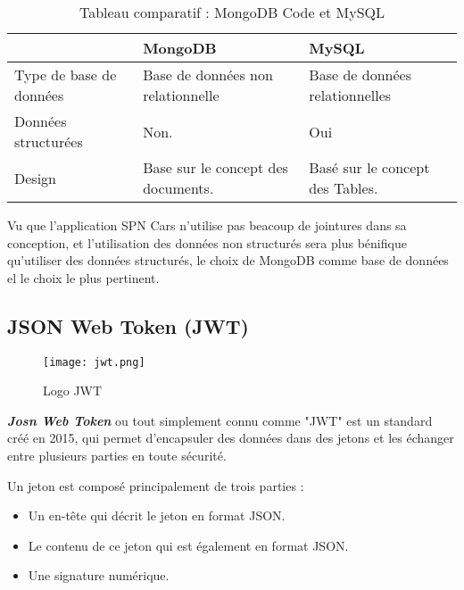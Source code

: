 \begin{table}[H]
    \begin{center}
        \begin{tabularx}{\textwidth} {
                | >{\centering\arraybackslash}X
                | >{\centering\arraybackslash}X
                | >{\centering\arraybackslash}X |}
            \hline
                                    & MongoDB                            & MySQL                           \\
            \hline
            Type de base de données & Base de données non relationnelle  & Base de données relationnelles  \\
            \hline
            Données structurées     & Non.                               & Oui                             \\
            \hline
            Design                  & Base sur le concept des documents. & Basé sur le concept des Tables. \\
            \hline
        \end{tabularx}
        \captionsetup{justification = centering}
        \caption{Tableau comparatif : MongoDB Code et MySQL}
        \label{compare_mongo_mysql}
    \end{center}
\end{table}


Vu que l'application SPN Cars n'utilise pas beacoup de jointures dans sa conception, et l'utilisation des données non structurés sera plus bénifique qu'utiliser des données structurés, le choix de MongoDB comme base de données el le choix le plus pertinent.

\subsection{JSON Web Token (JWT)}
\begin{figure}[H]
    \centering
    \texttt{[image: jwt.png]}
    \vspace{1cm}
    \captionsetup{justification=centering}
    \caption{Logo JWT}
    \label{fig:jwt_logo}
\end{figure}
\textbf{\textit{Josn Web Token}} ou tout simplement connu comme "JWT" est un standard créé en 2015, qui permet d'encapsuler des données dans des jetons et les échanger entre plusieurs parties en toute sécurité.

Un jeton est composé principalement de trois parties :
\begin{itemize}
    \item Un en-tête qui décrit le jeton en format JSON.
    \item Le contenu de ce jeton qui est également en format JSON.
    \item Une signature numérique.
\end{itemize}


